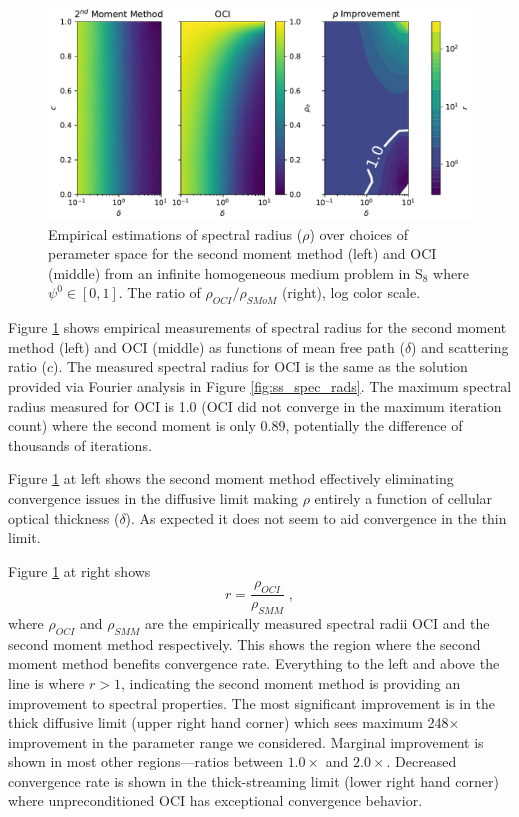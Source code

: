 \begin{figure}
    \centering
    \includegraphics[width=\linewidth]{figures/smm_paper/smm_acc.pdf}
    \caption{Empirical estimations of spectral radius ($\rho$) over choices of perameter space for the second moment method (left) and OCI (middle) from an infinite homogeneous medium problem in S$_8$ where $\psi^{0} \in [0,1]$. The ratio of $\rho_{OCI} / \rho_{SMoM}$ (right), log color scale.}
    \label{fig:spec_rad}
\end{figure}

Figure \ref{fig:spec_rad} shows empirical measurements of spectral radius for the second moment method (left) and OCI (middle) as functions of mean free path ($\delta$) and scattering ratio ($c$).
The measured spectral radius for OCI is the same as the solution provided via Fourier analysis in Figure \ref{fig:ss_spec_rads}.
The maximum spectral radius measured for OCI is \num{1.0} (OCI did not converge in the maximum iteration count) where the second moment is only \num{0.89}, potentially the difference of thousands of iterations.

Figure \ref{fig:spec_rad} at left shows the second moment method effectively eliminating convergence issues in the diffusive limit making $\rho$ entirely a function of cellular optical thickness ($\delta$).
As expected it does not seem to aid convergence in the thin limit.

Figure \ref{fig:spec_rad} at right shows
\begin{equation}
    r = \frac{\rho_{OCI}}{\rho_{SMM}} \; ,
\end{equation}
where $\rho_{OCI}$ and $\rho_{SMM}$ are the empirically measured spectral radii OCI and the second moment method respectively.
This shows the region where the second moment method benefits convergence rate.
Everything to the left and above the line is where $r > 1$, indicating the second moment method is providing an improvement to spectral properties.
The most significant improvement is in the thick diffusive limit (upper right hand corner) which sees maximum 248$\times$ improvement in the parameter range we considered.
Marginal improvement is shown in most other regions---ratios between $1.0\times$ and $2.0\times$.
Decreased convergence rate is shown in the thick-streaming limit (lower right hand corner) where unpreconditioned OCI has exceptional convergence behavior.

